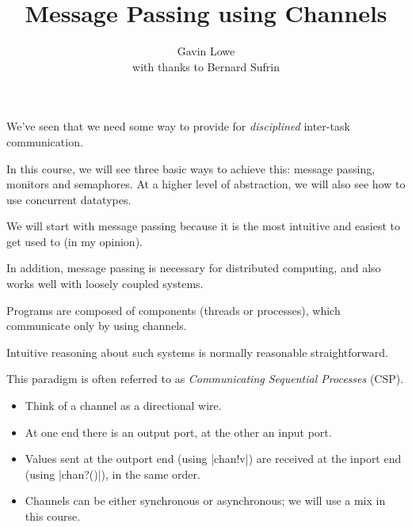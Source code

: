 \documentclass[notes,color]{sepslide0}
\title{Message Passing using Channels}
\author{Gavin Lowe \\ with thanks to Bernard Sufrin}
\begin{document}
\begin{slide}
  
  \Title

\end{slide}


\begin{slide}

We've seen that we need some way to provide for \emph{disciplined} inter-task
communication.

In this course, we will see three basic ways to achieve this: message passing,
monitors and semaphores.  At a higher level of abstraction, we will also see
how to use concurrent datatypes.  

We will start with message passing because it is the most intuitive and
easiest to get used to (in my opinion).

In addition, message passing is  necessary for distributed computing, and also
works well with loosely coupled systems. 
\end{slide}


\begin{slide}

Programs are composed of components (threads or processes), which
communicate only by using channels.

Intuitive reasoning about such systems is normally reasonable straightforward.

This paradigm is often referred to as \emph{Communicating Sequential
  Processes} (CSP).
\end{slide}


\begin{slide}

\begin{itemize}
\item Think of a channel as a directional wire.

\item At one end there is an output port, at the other an input port.
%
\begin{center}
\end{center}

\item Values sent at the outport end (using |chan!v|) are received at the
  inport end (using |chan?()|), in the same order.

\item
Channels can be either synchronous or asynchronous; we will use a mix in this
course.
\end{itemize}
\end{slide}
\end{document}
